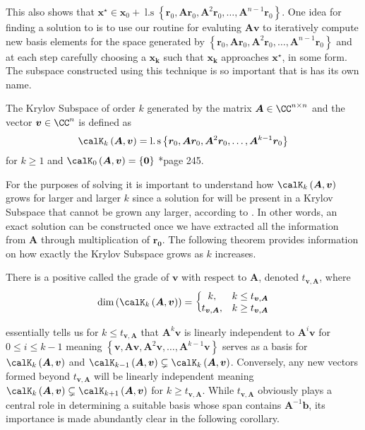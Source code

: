 This also shows that $\bm{x^{\star}} \in \bm{x}_0 + \operatorname{l.s} \left\{ \bm{r}_0, \bm{A} \bm{r}_0, \bm{A}^2 \bm{r}_0, \ldots , \bm{A}^{n-1} \bm{r}_0 \right\}$. One idea for finding a solution to  is to use our routine for evaluting $\bm{A} \bm{v}$ to iteratively compute new basis elements for the space generated by $\left\{ \bm{r}_0, \bm{A} \bm{r}_0, \bm{A}^2 \bm{r}_0, \ldots , \bm{A}^{n-1} \bm{r}_0 \right\}$ and at each step carefully choosing a $\bm{x_k}$ such that $\bm{x_k}$ approaches $\bm{x^{\star}}$, in some form. The subspace constructed using this technique is so important that is has its own name.
\begin{defe} \label{defe: krylov_subspace}
    The Krylov Subspace of order $k$ generated by the matrix $\bm{A} \in \CC^{n \times n}$ and the vector $\bm{v} \in \CC^{n}$ is defined as
    \[
        \calK_{k} \left( \bm{A},\bm{v} \right) = \operatorname{l.s} \left\{ \bm{r}_0, \bm{A} \bm{r}_0, \bm{A}^2 \bm{r}_0, \ldots , \bm{A}^{k-1} \bm{r}_0 \right\}
    \]
    for $k \geq 1$ and $\calK_{0} \left( \bm{A},\bm{v} \right) = \left\{ \bm{0} \right\}$ \cite{TrefethenLloydN.LloydNicholas1997Nla/}*{page 245}.
\end{defe}
For the purposes of solving  it is important to understand how $\calK_{k} \left( \bm{A},\bm{v} \right)$ grows for larger and larger $k$ since a solution for  will be present in a Krylov Subspace that cannot be grown any larger, according to . In other words, an exact solution can be constructed once we have extracted all the information from $\bm{A}$ through multiplication of $\bm{r_0}$. The following theorem provides information on how exactly the Krylov Subspace grows as $k$ increases.
\begin{thm} \label{theorem: grade_of_v}
    There is a positive called the grade of $\bm{v}$ with respect to $\bm{A}$, denoted $t_{\bm{v}, \bm{A}}$, where
    \[
        \operatorname{dim} \left( \calK_{k} \left( \bm{A} , \bm{v} \right) \right) = \left\{
        \begin{matrix}
            k,                  & k \leq t_{\bm{v}, \bm{A}} \\
            t_{\bm{v}, \bm{A}}, & k \geq t_{\bm{v}, \bm{A}}
        \end{matrix}
        \right.
    \]
\end{thm}
 essentially tells us for $k \leq t_{\bm{v}, \bm{A}}$ that $\bm{A}^k \bm{v}$ is linearly independent to $\bm{A}^i \bm{v}$ for $0 \leq i \leq k-1$ meaning $\left\{ \bm{v}, \bm{A} \bm{v}, \bm{A}^2 \bm{v}, \ldots , \bm{A}^{k-1} \bm{v} \right\}$ serves as a basis for $\calK_{k} \left( \bm{A},\bm{v} \right)$ and $\calK_{k-1} \left( \bm{A},\bm{v} \right) \subsetneq \calK_{k} \left( \bm{A},\bm{v} \right)$. Conversely, any new vectors formed beyond $t_{\bm{v}, \bm{A}}$ will be linearly independent meaning $\calK_{k} \left( \bm{A},\bm{v} \right) \subsetneq \calK_{k+1} \left( \bm{A},\bm{v} \right)$ for $k \geq t_{\bm{v}, \bm{A}}$. While $t_{\bm{v}, \bm{A}}$ obviously plays a central role in determining a suitable basis whose span contains $\bm{A}^{-1} \bm{b}$, its importance is made abundantly clear in the following corollary.
